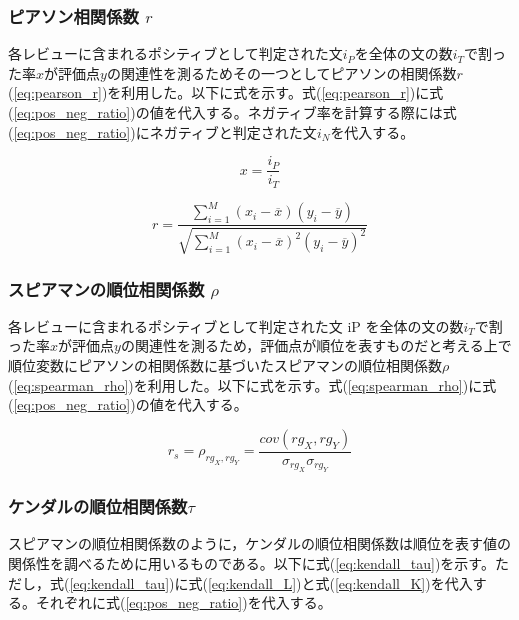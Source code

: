 \documentclass[review]{elsarticle}
\begin{document}
\begin{CJK}{UTF8}{min}
\subsubsection{ピアソン相関係数 \(r\)}\label{correl_pearson}

各レビューに含まれるポシティブとして判定された文\(i_P\)を全体の文の数\(i_T\)で割った率\(x\)が評価点\(y\)の関連性を測るためその一つとしてピアソンの相関係数\(r\)(\ref{eq:pearson_r})を利用した。以下に式を示す。式(\ref{eq:pearson_r})に式(\ref{eq:pos_neg_ratio})の値を代入する。ネガティブ率を計算する際には式(\ref{eq:pos_neg_ratio})にネガティブと判定された文\(i_N\)を代入する。

\begin{equation}\label{eq:pos_neg_ratio}
x = \frac{i_P}{i_T}
\end{equation}

\begin{equation}\label{eq:pearson_r}
r = \frac{{}\sum_{i=1}^{M} (x_i - \overline{x})(y_i - \overline{y})}
{\sqrt{\sum_{i=1}^{M} (x_i - \overline{x})^2(y_i - \overline{y})^2}}
\end{equation}

\subsubsection{スピアマンの順位相関係数 \(\rho\)}\label{correl_spearman}

各レビューに含まれるポシティブとして判定された文 iP を全体の文の数\(i_T\)で割った率\(x\)が評価点\(y\)の関連性を測るため，評価点が順位を表すものだと考える上で順位変数にピアソンの相関係数に基づいたスピアマンの順位相関係数\(\rho\)(\ref{eq:spearman_rho})を利用した。以下に式を示す。式(\ref{eq:spearman_rho})に式(\ref{eq:pos_neg_ratio})の値を代入する。

\begin{equation}\label{eq:spearman_rho}
r_s = \rho_{rg_X,rg_Y} = \frac{cov(rg_X,rg_Y)}{\sigma_{rg_X} \sigma_{rg_Y}}
\end{equation}

\subsubsection{ケンダルの順位相関係数\(\tau\)}\label{correl_kendall}

スピアマンの順位相関係数のように，ケンダルの順位相関係数は順位を表す値の関係性を調べるために用いるものである。以下に式(\ref{eq:kendall_tau})を示す。ただし，式(\ref{eq:kendall_tau})に式(\ref{eq:kendall_L})と式(\ref{eq:kendall_K})を代入する。それぞれに式(\ref{eq:pos_neg_ratio})を代入する。



\end{CJK}
\end{document}

